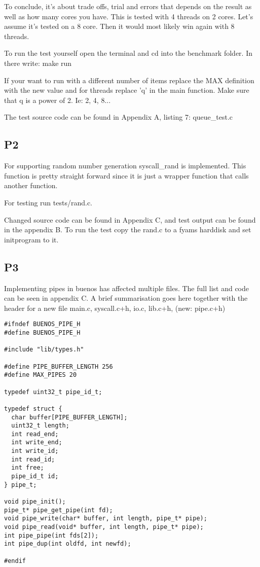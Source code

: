 \documentclass[12pt]{article}
\begin{document}
To conclude, it's about trade offs, trial and errors that depends on the result as well as how many cores you have. This is tested with 4 threads on 2 cores. Let's assume it's tested on a 8 core. Then it would most likely win again with 8 threads.

To run the test yourself open the terminal and cd into the benchmark folder. In there write: make run

If your want to run with a different number of items replace the MAX definition with the new value and for threads replace 'q' in the main function. Make sure that q is a power of 2. Ie: 2, 4, 8...

The test source code can be found in Appendix A, listing 7: queue\_test.c



\subsection{P2}

For supporting random number generation syscall\_rand is implemented. This function is pretty straight forward since it is just a wrapper function that calls another function.

For testing run tests/rand.c.

Changed source code can be found in Appendix C, and test output can be found in the appendix B. To run the test copy the rand.c to a fyams harddisk and set initprogram to it.


\subsection{P3}

Implementing pipes in buenos has affected multiple files. The full list and code can be seen in appendix C. A brief summarisation goes here together with the header for a new file  main.c, syscall.c+h, io.c, lib.c+h, (new: pipe.c+h)


\begin{lstlisting}[caption=pipe.h]
#ifndef BUENOS_PIPE_H
#define BUENOS_PIPE_H

#include "lib/types.h"

#define PIPE_BUFFER_LENGTH 256
#define MAX_PIPES 20

typedef uint32_t pipe_id_t;

typedef struct {
  char buffer[PIPE_BUFFER_LENGTH];
  uint32_t length;
  int read_end;
  int write_end;
  int write_id;
  int read_id;
  int free;
  pipe_id_t id;
} pipe_t;

void pipe_init();
pipe_t* pipe_get_pipe(int fd);
void pipe_write(char* buffer, int length, pipe_t* pipe);
void pipe_read(void* buffer, int length, pipe_t* pipe);
int pipe_pipe(int fds[2]);
int pipe_dup(int oldfd, int newfd);

#endif

\end{lstlisting}
\end{document}
